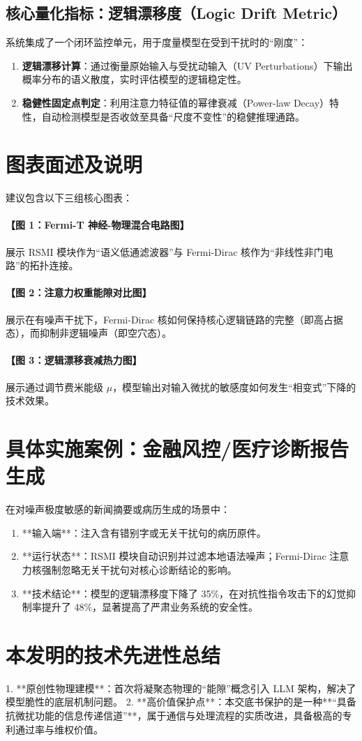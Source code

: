 \documentclass[UTF8, fontset=mac]{ctexart}
\begin{document}
\subsection{核心量化指标：逻辑漂移度（Logic Drift Metric）}
系统集成了一个闭环监控单元，用于度量模型在受到干扰时的“刚度”：
\begin{enumerate}
    \item \textbf{逻辑漂移计算}：通过衡量原始输入与受扰动输入（UV Perturbations）下输出概率分布的语义散度，实时评估模型的逻辑稳定性。
    \item \textbf{稳健性固定点判定}：利用注意力特征值的幂律衰减（Power-law Decay）特性，自动检测模型是否收敛至具备“尺度不变性”的稳健推理通路。
\end{enumerate}

\section{图表面述及说明}
建议包含以下三组核心图表：
\paragraph{【图 1：Fermi-T 神经-物理混合电路图】}展示 RSMI 模块作为“语义低通滤波器”与 Fermi-Dirac 核作为“非线性非门电路”的拓扑连接。
\paragraph{【图 2：注意力权重能隙对比图】}展示在有噪声干扰下，Fermi-Dirac 核如何保持核心逻辑链路的完整（即高占据态），而抑制非逻辑噪声（即空穴态）。
\paragraph{【图 3：逻辑漂移衰减热力图】}展示通过调节费米能级 $\mu$，模型输出对输入微扰的敏感度如何发生“相变式”下降的技术效果。

\section{具体实施案例：金融风控/医疗诊断报告生成}
在对噪声极度敏感的新闻摘要或病历生成的场景中：
\begin{enumerate}
    \item **输入端**：注入含有错别字或无关干扰句的病历原件。
    \item **运行状态**：RSMI 模块自动识别并过滤本地语法噪声；Fermi-Dirac 注意力核强制忽略无关干扰句对核心诊断结论的影响。
    \item **技术结论**：模型的逻辑漂移度下降了 35\%，在对抗性指令攻击下的幻觉抑制率提升了 48\%，显著提高了严肃业务系统的安全性。
\end{enumerate}

\section{本发明的技术先进性总结}
1. **原创性物理建模**：首次将凝聚态物理的“能隙”概念引入 LLM 架构，解决了模型脆性的底层机制问题。
2. **高价值保护点**：本交底书保护的是一种**“具备抗微扰功能的信息传递信道”**，属于通信与处理流程的实质改进，具备极高的专利通过率与维权价值。
\end{document}
